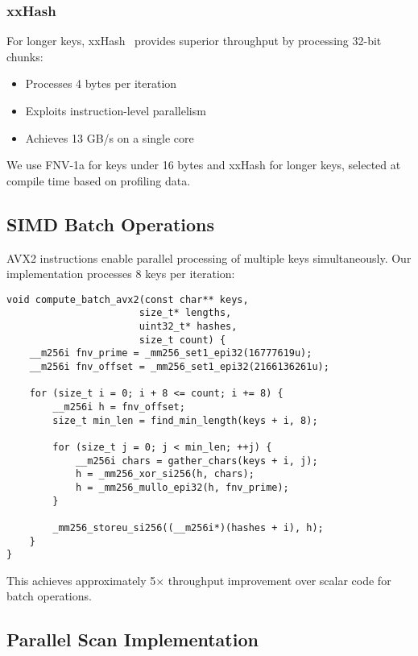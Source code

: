 \documentclass[10pt,conference]{IEEEtran}
\begin{document}
\subsubsection{xxHash}
For longer keys, xxHash~\cite{xxhash} provides superior throughput by processing 32-bit chunks:
\begin{itemize}
\item Processes 4 bytes per iteration
\item Exploits instruction-level parallelism
\item Achieves 13 GB/s on a single core
\end{itemize}

We use FNV-1a for keys under 16 bytes and xxHash for longer keys, selected at compile time based on profiling data.

\subsection{SIMD Batch Operations}

AVX2 instructions enable parallel processing of multiple keys simultaneously. Our implementation processes 8 keys per iteration:

\begin{lstlisting}[caption={SIMD batch hash computation},label={lst:simd}]
void compute_batch_avx2(const char** keys, 
                       size_t* lengths,
                       uint32_t* hashes,
                       size_t count) {
    __m256i fnv_prime = _mm256_set1_epi32(16777619u);
    __m256i fnv_offset = _mm256_set1_epi32(2166136261u);
    
    for (size_t i = 0; i + 8 <= count; i += 8) {
        __m256i h = fnv_offset;
        size_t min_len = find_min_length(keys + i, 8);
        
        for (size_t j = 0; j < min_len; ++j) {
            __m256i chars = gather_chars(keys + i, j);
            h = _mm256_xor_si256(h, chars);
            h = _mm256_mullo_epi32(h, fnv_prime);
        }
        
        _mm256_storeu_si256((__m256i*)(hashes + i), h);
    }
}
\end{lstlisting}

This achieves approximately 5$\times$ throughput improvement over scalar code for batch operations.

\subsection{Parallel Scan Implementation}
\end{document}
